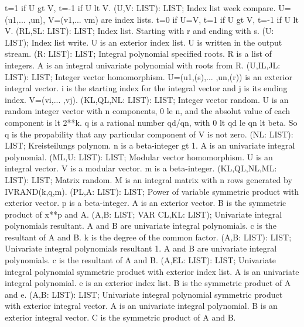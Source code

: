 t=1 if U gt V, t=-1 if U lt V. \ecom 
{} (U,V: LIST): LIST; \eproc
\bcom Index list week compare. U=(u1,... ,un), V=(v1,... vm) are
index lists. t=0 if U=V, t=1 if U gt V, t=-1 if U lt V. \ecom 
{} (RL,SL: LIST): LIST; \eproc
\bcom Index list. Starting with r and ending with s. \ecom 
{} (U: LIST); \eproc
\bcom Index list write. U is an exterior index list.
U is written in the output stream. \ecom 
{} (R: LIST): LIST; \eproc
\bcom Integral polynomial specified roots. R is a list of integers.
A is an integral univariate polynomial with roots from R.  \ecom 
{} (U,IL,JL: LIST): LIST; \eproc
\bcom Integer vector homomorphism. U=(u1,(s),... ,un,(r))
is an exterior integral vector. i is the starting index
for the integral vector and j is its ending index.
V=(vi,... ,vj).  \ecom 
{} (KL,QL,NL: LIST): LIST; \eproc
\bcom Integer vector random. U is an random integer vector with
n components, 0 le n, and the absolut value of each
component is lt 2**k. q is a rational number qd/qn,
with 0 lt qd le qn lt beta. So q is the propability
that any particular component of V is not zero. \ecom 
{} (NL: LIST): LIST; \eproc
\bcom Kreisteilungs polynom. n is a beta-integer gt 1.
A is an univariate integral polynomial.  \ecom 
{} (ML,U: LIST): LIST; \eproc
\bcom Modular vector homomorphism. U is an integral vector.
V is a modular vector. m is a beta-integer. \ecom 
{} (KL,QL,NL,ML: LIST): LIST; \eproc
\bcom Matrix random. M is an integral matrix with n rows generated
by IVRAND(k,q,m).  \ecom 
{} (PL,A: LIST): LIST; \eproc
\bcom Power of variable symmetric product with exterior vector.
p is a beta-integer. A is an exterior vector. B is the
symmetric product of x**p and A. \ecom 
{} (A,B: LIST; VAR CL,KL: LIST); \eproc
\bcom Univariate integral polynomials resultant. A and B are
univariate integral polynomials. c is the resultant of
A and B. k is the degree of the common factor.  \ecom 
{} (A,B: LIST): LIST; \eproc
\bcom Univariate integral polynomials resultant 1. A and B are
univariate integral polynomials. c is the resultant of
A and B.  \ecom 
{} (A,EL: LIST): LIST; \eproc
\bcom Univariate integral polynomial symmetric product with exterior index list.
A is an univariate integral polynomial. e is an exterior index 
list. B is the symmetric product of A and e. \ecom 
{} (A,B: LIST): LIST; \eproc
\bcom Univariate integral polynomial symmetric product with exterior integral vector.
A is an univariate integral polynomial. B is an exterior integral 
vector. C is the symmetric product of A and B. \ecom 
